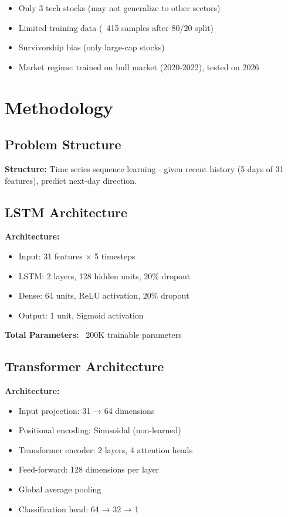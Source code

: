 \documentclass[10pt,twocolumn]{article}
\begin{document}
\begin{itemize}
\item Only 3 tech stocks (may not generalize to other sectors)
\item Limited training data (~415 samples after 80/20 split)
\item Survivorship bias (only large-cap stocks)
\item Market regime: trained on bull market (2020-2022), tested on 2026
\end{itemize}

\section{Methodology}

\subsection{Problem Structure}

\textbf{Structure:} Time series sequence learning - given recent history (5 days of 31 features), predict next-day direction.

\subsection{LSTM Architecture}

\textbf{Architecture:}
\begin{itemize}
\item Input: 31 features × 5 timesteps
\item LSTM: 2 layers, 128 hidden units, 20\% dropout
\item Dense: 64 units, ReLU activation, 20\% dropout
\item Output: 1 unit, Sigmoid activation
\end{itemize}

\textbf{Total Parameters:} ~200K trainable parameters

\subsection{Transformer Architecture}

\textbf{Architecture:}
\begin{itemize}
\item Input projection: 31 → 64 dimensions
\item Positional encoding: Sinusoidal (non-learned)
\item Transformer encoder: 2 layers, 4 attention heads
\item Feed-forward: 128 dimensions per layer
\item Global average pooling
\item Classification head: 64 → 32 → 1
\end{itemize}
\end{document}
